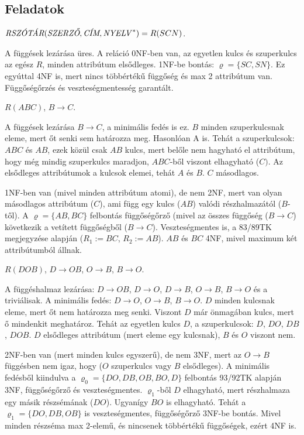 \documentclass{article}
\begin{document}
\subsection*{Feladatok}


$\hbox{\it RSZÓTÁR}(\hbox{\it SZERZŐ},\hbox{\it CÍM},\hbox{\it NYELV\/}^*)=
R(SCN)$. %

\megoldas A függések lezárása üres.
A reláció 0NF-ben van, az egyetlen kulcs és szuperkulcs az egész $R$, minden
 attribútum elsődleges. 1NF-be bontás: $\varrho=\{SC, SN\}$. Ez egyúttal 4NF
is, mert nincs többértékű függőség és max 2 attribútum van. Függőségőrzés és
veszteségmentesség garantált.

$R(ABC)$, $B\to C$.

\megoldas A függések lezárása $B\to C$, a minimális fedés is ez.
$B$ minden szuperkulcsnak eleme, mert őt senki sem határozza meg. Hasonlóan
A is. Tehát a szuperkulcsok: $ABC$ és $AB$, ezek közül csak $AB$ kulcs, mert
belőle nem hagyható el attribútum, hogy még mindig szuperkulcs maradjon,
$ABC$-ből viszont elhagyható ($C)$. Az elsődleges attribútumok a kulcsok elemei,
tehát $A$ és $B$. $C$ másodlagos.

1NF-ben van (mivel minden attribútum atomi), de nem 2NF, mert van olyan
másodlagos attribútum ($C$), ami függ egy kulcs ($AB$) valódi részhalmazától
($B$-től). A $\varrho=\{AB, BC\}$ felbontás függőségőrző (mivel az összes
függőség ($B\to C$) következik a vetített függőségből ($B\to C$).
Veszteségmentes is, a 83/89TK megjegyzése alapján ($R_1:=BC$, $R_2:=AB$). $AB$
és $BC$ 4NF, mivel maximum két attribútumból állnak.

$R(DOB)$, $D\to OB$, $O\to B$, $B\to O$.

\megoldas A függéshalmaz lezárása: $D\to OB$, $D\to O$, $D\to B$, $O\to B$, $B\to O$
és a triviálisak.
A minimális fedés: $D\to O$, $O\to B$, $B\to O$.
$D$ minden kulcsnak eleme, mert őt nem határozza meg senki.
Viszont $D$ már önmagában kulcs, mert ő mindenkit meghatároz. Tehát az
egyetlen kulcs $D$, a szuperkulcsok: $D$, $DO$, $DB$, $DOB$. $D$ elsődleges
attribútum (mert eleme egy kulcsnak), $B$ és $O$ viszont nem.

2NF-ben van (mert minden kulcs egyszerű), de nem 3NF, mert az $O\to B$
függésben nem igaz, hogy ($O$ szuperkulcs vagy $B$ elsődleges). A minimális
fedésből kiindulva a $\varrho_0=\{DO,DB,OB,BO,D\}$ felbontás 93/92TK alapján 3NF,
függőségőrző és veszteségmentes. $\varrho_1$-ből $D$ elhagyható, mert
részhalmaza egy másik részsémának ($DO$). Ugyanígy $BO$ is elhagyható. Tehát
a $\varrho_1=\{DO,DB,OB\}$ is veszteségmentes, függőségőrző 3NF-be bontás.
Mivel minden részséma max 2-elemű, és nincsenek többértékű függőségek,
ezért 4NF is.
\end{document}
